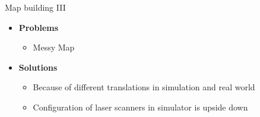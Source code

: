 \begin{frame}{Map building III}
\begin{itemize}
	\item \textbf{Problems}
		\begin{itemize}
			\item Messy Map
		\end{itemize}
	\item \textbf{Solutions}
		\begin{itemize}
			\item Because of different translations in simulation and real world
			\item Configuration of laser scanners in simulator is upside down 
		\end{itemize}
\end{itemize}
\end{frame}

